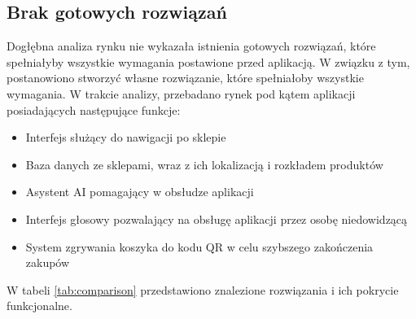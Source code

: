 \subsection{Brak gotowych rozwiązań}

Dogłębna analiza rynku nie wykazała istnienia gotowych rozwiązań, które spełniałyby wszystkie wymagania postawione przed aplikacją. W związku z tym, postanowiono stworzyć własne rozwiązanie, które spełniałoby wszystkie wymagania. W trakcie analizy, przebadano rynek pod kątem aplikacji posiadających następujące funkcje:
\begin{itemize}
    \item Interfejs służący do nawigacji po sklepie
    \item Baza danych ze sklepami, wraz z ich lokalizacją i rozkładem produktów
    \item Asystent AI pomagający w obsłudze aplikacji
    \item Interfejs głosowy pozwalający na obsługę aplikacji przez osobę niedowidzącą
    \item System zgrywania koszyka do kodu QR w celu szybszego zakończenia zakupów
\end{itemize}
W tabeli \ref{tab:comparison} przedstawiono znalezione rozwiązania i ich pokrycie funkcjonalne.



